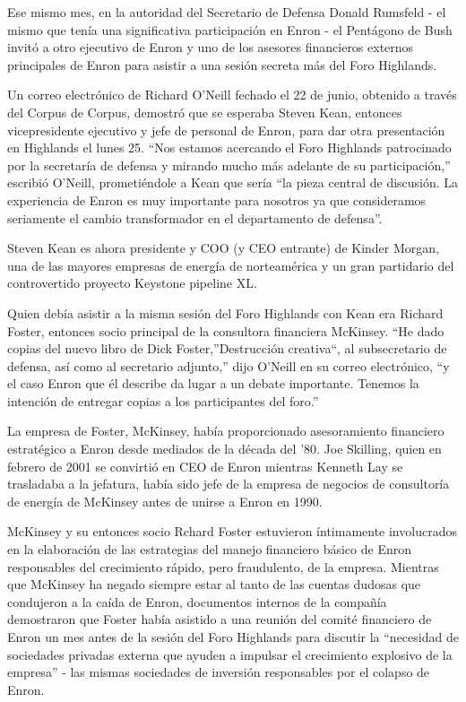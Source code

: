 \documentclass[10pt,a5paper,twoside,spanish,]{book}
\begin{document}
Ese mismo mes, en la autoridad del Secretario de Defensa Donald Rumsfeld
- el mismo que tenía una significativa participación en Enron - el
Pentágono de Bush invitó a otro ejecutivo de Enron y uno de los asesores
financieros externos principales de Enron para asistir a una sesión
secreta más del Foro Highlands.

Un correo electrónico de Richard O'Neill fechado el 22 de junio,
obtenido a través del Corpus de Corpus, demostró que se esperaba Steven
Kean, entonces vicepresidente ejecutivo y jefe de personal de Enron,
para dar otra presentación en Highlands el lunes 25. ``Nos estamos
acercando el Foro Highlands patrocinado por la secretaría de defensa y
mirando mucho más adelante de su participación,'' escribió O'Neill,
prometiéndole a Kean que sería ``la pieza central de discusión. La
experiencia de Enron es muy importante para nosotros ya que consideramos
seriamente el cambio transformador en el departamento de defensa''.

Steven Kean es ahora presidente y COO (y CEO entrante) de Kinder Morgan,
una de las mayores empresas de energía de norteamérica y un gran
partidario del controvertido proyecto Keystone pipeline XL.

Quien debía asistir a la misma sesión del Foro Highlands con Kean era
Richard Foster, entonces socio principal de la consultora financiera
McKinsey. ``He dado copias del nuevo libro de Dick Foster,''Destrucción
creativa``, al subsecretario de defensa, así como al secretario
adjunto,'' dijo O'Neill en su correo electrónico, ``y el caso Enron que
él describe da lugar a un debate importante. Tenemos la intención de
entregar copias a los participantes del foro.''

La empresa de Foster, McKinsey, había proporcionado asesoramiento
financiero estratégico a Enron desde mediados de la década del '80. Joe
Skilling, quien en febrero de 2001 se convirtió en CEO de Enron mientras
Kenneth Lay se trasladaba a la jefatura, había sido jefe de la empresa
de negocios de consultoría de energía de McKinsey antes de unirse a
Enron en 1990.

McKinsey y su entonces socio Rchard Foster estuvieron íntimamente
involucrados en la elaboración de las estrategias del manejo financiero
básico de Enron responsables del crecimiento rápido, pero fraudulento,
de la empresa. Mientras que McKinsey ha negado siempre estar al tanto de
las cuentas dudosas que condujeron a la caída de Enron, documentos
internos de la compañía demostraron que Foster había asistido a una
reunión del comité financiero de Enron un mes antes de la sesión del
Foro Highlands para discutir la ``necesidad de sociedades privadas
externa que ayuden a impulsar el crecimiento explosivo de la empresa'' -
las mismas sociedades de inversión responsables por el colapso de Enron.
\end{document}
